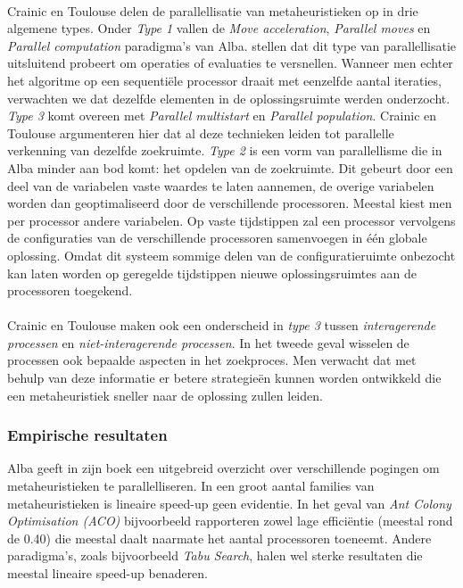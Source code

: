 \paragraph{}
Crainic en Toulouse\cite{crainicAndToulouse} delen de parallellisatie van metaheuristieken op in drie algemene types. Onder \emph{Type 1} vallen de \emph{Move acceleration}, \emph{Parallel moves} en \emph{Parallel computation} paradigma's van Alba. \cite{crainicAndToulouse} stellen dat dit type van parallellisatie uitsluitend probeert om operaties of evaluaties te versnellen. Wanneer men echter het algoritme op een sequenti\"ele processor draait met eenzelfde aantal iteraties, verwachten we dat dezelfde elementen in de oplossingsruimte werden onderzocht. \emph{Type 3} komt overeen met \emph{Parallel multistart} en \emph{Parallel population}. Crainic en Toulouse argumenteren hier dat al deze technieken leiden tot parallelle verkenning van dezelfde zoekruimte. \emph{Type 2} is een vorm van parallellisme die in Alba minder aan bod komt: het opdelen van de zoekruimte. Dit gebeurt door een deel van de variabelen vaste waardes te laten aannemen, de overige variabelen worden dan geoptimaliseerd door de verschillende processoren. Meestal kiest men per processor andere variabelen. Op vaste tijdstippen zal een processor vervolgens de configuraties van de verschillende processoren samenvoegen in \'e\'en globale oplossing. Omdat dit systeem sommige delen van de configuratieruimte onbezocht kan laten worden op geregelde tijdstippen nieuwe oplossingsruimtes aan de processoren toegekend.

\paragraph{}
Crainic en Toulouse maken ook een onderscheid in \emph{type 3} tussen \emph{interagerende processen} en \emph{niet-interagerende processen}. In het tweede geval wisselen de processen ook bepaalde aspecten in het zoekproces. Men verwacht dat met behulp van deze informatie er betere strategie\"en kunnen worden ontwikkeld die een metaheuristiek sneller naar de oplossing zullen leiden.

\subsubsection{Empirische resultaten}

Alba geeft in zijn boek een uitgebreid overzicht over verschillende pogingen om metaheuristieken te parallelliseren. In een groot aantal families van metaheuristieken is lineaire speed-up geen evidentie. In het geval van \emph{Ant Colony Optimisation (ACO)} bijvoorbeeld rapporteren zowel \cite{alba8-42,alba8-38,alba8-7,alba8-16} lage effici\"entie (meestal rond de 0.40) die meestal daalt naarmate het aantal processoren toeneemt. Andere paradigma's, zoals bijvoorbeeld \emph{Tabu Search}, halen wel sterke resultaten die meestal lineaire speed-up benaderen.

